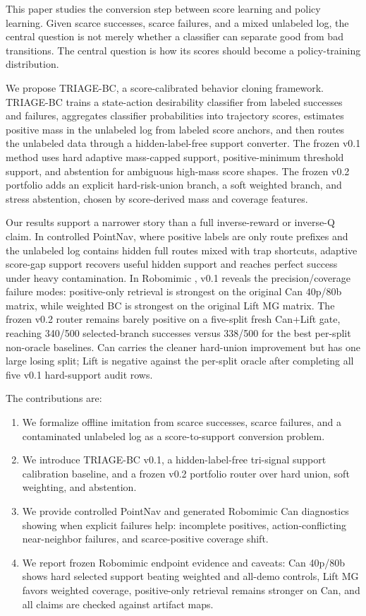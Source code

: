 \documentclass[11pt]{article}
\newcommand{\method}{TRIAGE-BC}
\begin{document}
This paper studies the conversion step between score learning and policy learning. Given scarce successes, scarce failures, and a mixed unlabeled log, the central question is not merely whether a classifier can separate good from bad transitions. The central question is how its scores should become a policy-training distribution.

We propose \method{}, a score-calibrated behavior cloning framework. \method{} trains a state-action desirability classifier from labeled successes and failures, aggregates classifier probabilities into trajectory scores, estimates positive mass in the unlabeled log from labeled score anchors, and then routes the unlabeled data through a hidden-label-free support converter. The frozen v0.1 method uses hard adaptive mass-capped support, positive-minimum threshold support, and abstention for ambiguous high-mass score shapes. The frozen v0.2 portfolio adds an explicit hard-risk-union branch, a soft weighted branch, and stress abstention, chosen by score-derived mass and coverage features.

Our results support a narrower story than a full inverse-reward or inverse-Q claim. In controlled PointNav, where positive labels are only route prefixes and the unlabeled log contains hidden full routes mixed with trap shortcuts, adaptive score-gap support recovers useful hidden support and reaches perfect success under heavy contamination. In Robomimic \cite{mandlekar2021robomimic}, v0.1 reveals the precision/coverage failure modes: positive-only retrieval is strongest on the original Can 40p/80b matrix, while weighted BC is strongest on the original Lift MG matrix. The frozen v0.2 router remains barely positive on a five-split fresh Can+Lift gate, reaching 340/500 selected-branch successes versus 338/500 for the best per-split non-oracle baselines. Can carries the cleaner hard-union improvement but has one large losing split; Lift is negative against the per-split oracle after completing all five v0.1 hard-support audit rows.

The contributions are:
\begin{enumerate}[leftmargin=*]
  \item We formalize offline imitation from scarce successes, scarce failures, and a contaminated unlabeled log as a score-to-support conversion problem.
  \item We introduce \method{} v0.1, a hidden-label-free tri-signal support calibration baseline, and a frozen v0.2 portfolio router over hard union, soft weighting, and abstention.
  \item We provide controlled PointNav and generated Robomimic Can diagnostics showing when explicit failures help: incomplete positives, action-conflicting near-neighbor failures, and scarce-positive coverage shift.
  \item We report frozen Robomimic endpoint evidence and caveats: Can 40p/80b shows hard selected support beating weighted and all-demo controls, Lift MG favors weighted coverage, positive-only retrieval remains stronger on Can, and all claims are checked against artifact maps.
\end{enumerate}
\end{document}
